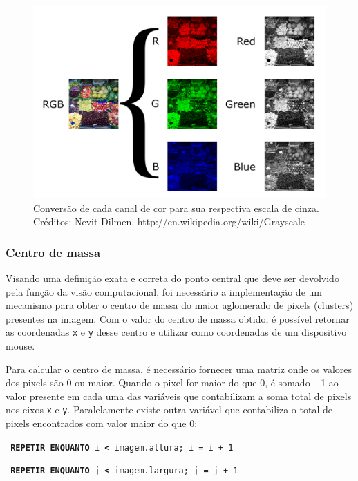 \documentclass[12pt]{article}
\begin{document}
	\begin{figure}[ht!]
	\begin{center}
		\includegraphics[scale=0.7]{img/1200px-Beyoglu_4671_tricolor.png}
		\footnotesize \caption{Convers\~ao de cada canal de cor para sua respectiva escala de cinza. Cr\'editos: Nevit Dilmen. http://en.wikipedia.org/wiki/Grayscale }
	\end{center}
	\end{figure}	

\subsubsection{Centro de massa}
Visando uma defini\c c\~ao exata e correta do ponto central que deve ser devolvido pela fun\c c\~ao da vis\~ao computacional,
foi necess\'ario a implementa\c c\~ao de um mecanismo para obter o centro de massa do maior aglomerado de pixels (clusters) presentes
na imagem. Com o valor do centro de massa obtido, \'e poss\'ivel retornar as coordenadas \texttt{x} e \texttt{y} desse centro e utilizar como
coordenadas de um dispositivo mouse.

Para calcular o centro de massa, \'e necess\'ario fornecer uma matriz onde os valores dos pixels s\~ao 0 ou maior.
Quando o pixel for maior do que 0, \'e somado +1 ao valor presente em cada uma das vari\'aveis que contabilizam a
soma total de pixels nos eixos \texttt{x} e \texttt{y}. Paralelamente existe outra vari\'avel que contabiliza o total de pixels
encontrados com valor maior do que 0:


\noindent \texttt{\footnotesize{ \textbf{REPETIR ENQUANTO} i \textbf{<} imagem.altura; i = i + 1} }

\hspace{0.2cm} \texttt{\footnotesize{ \textbf{REPETIR ENQUANTO} j \textbf{<} imagem.largura; j = j + 1}}
\end{document}
